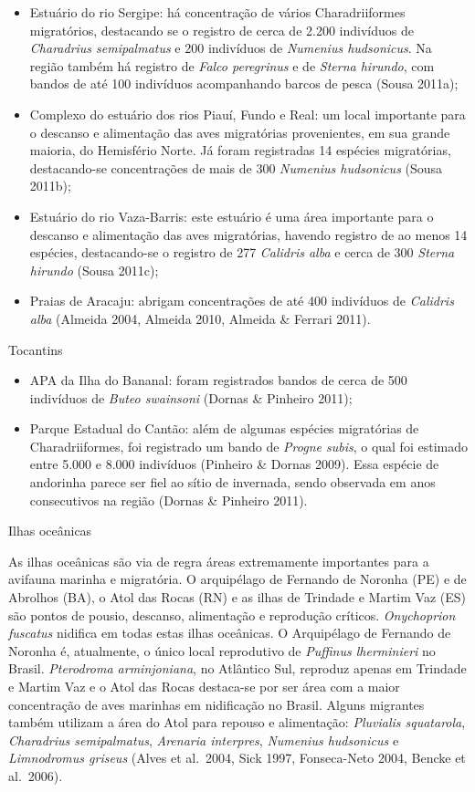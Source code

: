 \documentclass[
]{scrbook}
\begin{document}
\begin{itemize}
\item
  Estuário do rio Sergipe: há concentração de vários Charadriiformes migratórios, destacando se o registro de cerca de 2.200 indivíduos de \emph{Charadrius semipalmatus} e 200 indivíduos de \emph{Numenius hudsonicus}. Na região também há registro de \emph{Falco peregrinus} e de \emph{Sterna hirundo}, com bandos de até 100 indivíduos acompanhando barcos de pesca (Sousa 2011a);
\item
  Complexo do estuário dos rios Piauí, Fundo e Real: um local importante para o descanso e alimentação das aves migratórias provenientes, em sua grande maioria, do Hemisfério Norte. Já foram registradas 14 espécies migratórias, destacando-se concentrações de mais de 300 \emph{Numenius hudsonicus} (Sousa 2011b);
\item
  Estuário do rio Vaza-Barris: este estuário é uma área importante para o descanso e alimentação das aves migratórias, havendo registro de ao menos 14 espécies, destacando-se o registro de 277 \emph{Calidris alba} e cerca de 300 \emph{Sterna hirundo} (Sousa 2011c);
\item
  Praias de Aracaju: abrigam concentrações de até 400 indivíduos de \emph{Calidris alba} (Almeida 2004, Almeida 2010, Almeida \& Ferrari 2011).
\end{itemize}

Tocantins

\begin{itemize}
\item
  APA da Ilha do Bananal: foram registrados bandos de cerca de 500 indivíduos de \emph{Buteo swainsoni} (Dornas \& Pinheiro 2011);
\item
  Parque Estadual do Cantão: além de algumas espécies migratórias de Charadriiformes, foi registrado um bando de \emph{Progne subis}, o qual foi estimado entre 5.000 e 8.000 indivíduos (Pinheiro \& Dornas 2009). Essa espécie de andorinha parece ser fiel ao sítio de invernada, sendo observada em anos consecutivos na região (Dornas \& Pinheiro 2011).
\end{itemize}

Ilhas oceânicas

As ilhas oceânicas são via de regra áreas extremamente importantes para a avifauna marinha e migratória. O arquipélago de Fernando de Noronha (PE) e de Abrolhos (BA), o Atol das Rocas (RN) e as ilhas de Trindade e Martim Vaz (ES) são pontos de pousio, descanso, alimentação e reprodução críticos. \emph{Onychoprion fuscatus} nidifica em todas estas ilhas oceânicas. O Arquipélago de Fernando de Noronha é, atualmente, o único local reprodutivo de \emph{Puffinus lherminieri} no Brasil. \emph{Pterodroma arminjoniana}, no Atlântico Sul, reproduz apenas em Trindade e Martim Vaz e o Atol das Rocas destaca-se por ser área com a maior concentração de aves marinhas em nidificação no Brasil. Alguns migrantes também utilizam a área do Atol para repouso e alimentação: \emph{Pluvialis squatarola}, \emph{Charadrius semipalmatus}, \emph{Arenaria interpres}, \emph{Numenius hudsonicus} e \emph{Limnodromus griseus} (Alves et al.~2004, Sick 1997, Fonseca-Neto 2004, Bencke et al.~2006).
\end{document}
